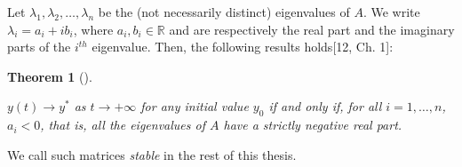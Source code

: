 \documentclass[
  letterpaper,
]{report}
\theoremstyle{plain}
\newtheorem{theorem}{Theorem}[chapter]
\theoremstyle{definition}
\theoremstyle{definition}
\theoremstyle{remark}
\begin{document}
Let \(\lambda_1 , \lambda_2 , \dots , \lambda_n\) be the (not
necessarily distinct) eigenvalues of \(A\). We write
\(\lambda_i = a_i + ib_i\), where \(a_i,b_i \in \mathbb{R}\) and are
respectively the real part and the imaginary parts of the \(i^{th}\)
eigenvalue. Then, the following results holds{[}12, Ch. 1{]}:

\leavevmode{}%
\begin{theorem}[]\label{thm-steadyState}

\(y(t) \to y^*\) as \(t \to +\infty\) for any initial value \(y_0\) if
and only if, for all \(i = 1 , \dots , n\), \(a_i <0\), that is, all the
eigenvalues of \(A\) have a strictly negative real part.

\end{theorem}

We call such matrices \emph{stable} in the rest of this thesis.
\end{document}
